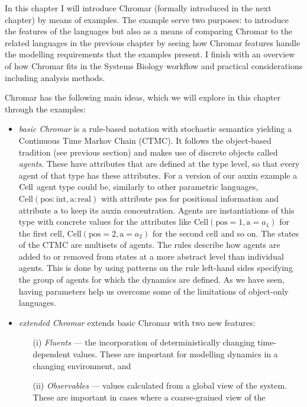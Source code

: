 In this chapter I will introduce Chromar (formally introduced in the next
chapter) by means of examples. The example serve two purposes: to introduce the
features of the languages but also as a means of comparing Chromar to the related
languages in the previous chapter by seeing how Chromar features handle the
modelling requirements that the examples present. I finish with an overview of
how Chromar fits in the Systems Biology workflow and practical considerations
including analysis methods.

Chromar has the following main ideas, which we will explore in this chapter
through the examples:
\begin{itemize}
\item \emph{basic Chromar} is a rule-based notation with stochastic semantics
  yielding a Continuous Time Markov Chain (CTMC). It follows the object-based
  tradition (see previous section) and makes use of discrete objects called
  \emph{agents}. These have attributes that are defined at the type level, so
  that every agent of that type has these attributes. For a version of our auxin
  example a $\mathrm{Cell}$ agent type could be, similarly to other parametric
  languages,
  $\mathrm{Cell}(\mathrm{pos}:\mathrm{int}, \mathrm{a}: \mathrm{real})$ with
  attribute $\mathrm{pos}$ for positional information and attribute $\mathrm{a}$
  to keep its auxin concentration. Agents are instantiations of this type with
  concrete values for the attributes like
  $\mathrm{Cell}(\mathrm{pos}=1, \mathrm{a}=a_1)$ for the first cell,
  $\mathrm{Cell}(\mathrm{pos}=2, \mathrm{a}=a_2)$ for the second cell and so
  on. The states of the CTMC are multisets of agents. The rules describe how
  agents are added to or removed from states at a more abstract level than
  individual agents. This is done by using patterns on the rule left-hand sides
  specifying the group of agents for which the dynamics are defined. As we have
  seen, having parameters help us overcome some of the limitations of object-only
  languages.
\item \emph{extended Chromar} extends basic Chromar with two new features:
  \begin{itemize}
  \item[(i)] \textit{Fluents} --- the incorporation of deterministically
    changing time-dependent values. These are important for modelling dynamics
    in a changing environment, and
  \item[(ii)] \textit{Observables} --- values calculated from a global view of
    the system. These are important in cases where a coarse-grained view of the

\end{itemize}
\end{itemize}
